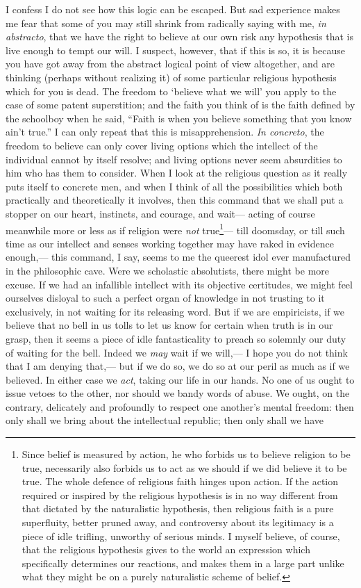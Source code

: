 \documentclass[12pt]{article}
\begin{document}
 I confess I do not see how this logic can be escaped.  But sad experience makes me fear that some of you may still shrink from radically saying with me, \emph{in abstracto}, that we have the right to believe at our own risk any hypothesis that is live enough to tempt our will.  I suspect, however, that if this is so, it is because you have got away from the abstract logical point of view altogether, and are thinking (perhaps without realizing it) of some particular religious hypothesis which for you is dead.  The freedom to `believe what we will' you apply to the case of some patent superstition; and the faith you think of is the faith defined by the schoolboy when he said, ``Faith is when you believe something that you know ain't true.''  I can only repeat that this is misapprehension.  \emph{In concreto}, the freedom to believe can only cover living options which the intellect of the individual cannot by itself resolve; and living options never seem absurdities to him who has them to consider.  When I look at the religious question as it really puts itself to concrete men, and when I think of all the possibilities which both practically and theoretically it involves, then this command that we shall put a stopper on our heart, instincts, and courage, and wait--- acting of course meanwhile more or less as if religion were \emph{not} true\footnote{Since belief is measured by action, he who forbids us to believe religion to be true, necessarily also forbids us to act as we should if we did believe it to be true.  The whole defence of religious faith hinges upon action.  If the action required or inspired by the religious hypothesis is in no way different from that dictated by the naturalistic hypothesis, then religious faith is a pure superfluity, better pruned away, and controversy about its legitimacy is a piece of idle trifling, unworthy of serious minds.  I myself believe, of course, that the religious hypothesis gives to the world an expression which specifically determines our reactions, and makes them in a large part unlike what they might be on a purely naturalistic scheme of belief.}--- till  doomsday, or till such time as our intellect and senses working together may have raked in evidence enough,--- this command, I say, seems to me the queerest idol ever manufactured in the philosophic cave.  Were we scholastic absolutists, there might be more excuse.  If we had an infallible intellect with its objective certitudes, we might feel ourselves disloyal to such a perfect organ of knowledge in not trusting to it exclusively, in not waiting for its releasing word.  But if we are empiricists, if we believe that no bell in us tolls to let us know for certain when truth is in our grasp, then it seems a piece of idle fantasticality to preach so solemnly our duty of waiting for the bell. Indeed we \emph{may} wait if we will,--- I hope you do not think that I am denying that,--- but if we do so, we do so at our peril as much as if we believed.  In either case we \emph{act}, taking our life in our hands.  No one of us ought to issue vetoes to the other, nor should we bandy words of abuse.  We ought, on the contrary, delicately and profoundly to respect one another's mental freedom: then only shall we bring about the intellectual republic; then only shall we have 
\end{document}
